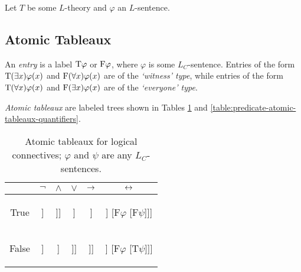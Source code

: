 Let $T$ be some $L$-theory and $\varphi$ an $L$-sentence.

\subsection{Atomic Tableaux}

An \emph{entry} is a label $\mathrm{T}\varphi$ or $\mathrm{F}\varphi$, where $\varphi$ is some $L_C$-sentence. Entries of the form $\mathrm{T}(\exists x)\varphi(x)$ and $\mathrm{F}(\forall x)\varphi(x)$ are of the \emph{`witness' type}, while entries of the form $\mathrm{T}(\forall x)\varphi(x)$ and $\mathrm{F}(\exists x)\varphi(x)$ are of the \emph{`everyone' type}.

\emph{Atomic tableaux} are labeled trees shown in Tables \ref{table:predicate-atomic-tableaux-logical} and \ref{table:predicate-atomic-tableaux-quantifiers}.

\begin{table}[htbp]
\centering
\begin{tabular}{@{}c||c|c|c|c|c@{}}
 & $\neg$ & $\land$ & $\lor$ & $\mathbin{\rightarrow}$ & $\mathbin{\leftrightarrow}$  \\ \midrule \midrule
True
&  
\begin{forest}
[$\mathrm{T}\neg\varphi$ [$\mathrm{F}\varphi$]]
\end{forest}
&  
\begin{forest}
[$\mathrm{T}\varphi\land\psi$ [$\mathrm{T}\varphi$ [$\mathrm{T}\psi$]]]
\end{forest}
& 
\begin{forest}
[$\mathrm{T}\varphi\lor\psi$ [$\mathrm{T}\varphi$] [$\mathrm{T}\psi$]]
\end{forest}
&
\begin{forest}
[$\mathrm{T}\varphi\limplies\psi$ [$\mathrm{F}\varphi$] [$\mathrm{T}\psi$]]
\end{forest}
&  
\begin{forest}
[$\mathrm{T}\varphi\liff\psi$ [$\mathrm{T}\varphi$ [$\mathrm{T}\psi$]] [$\mathrm{F}\varphi$ [$\mathrm{F}\psi$]]]
\end{forest}
\\ \midrule
False 
& 
\begin{forest}
[$\mathrm{F}\neg\varphi$ [$\mathrm{T}\varphi$]]
\end{forest}
&
\begin{forest}
[$\mathrm{F}\varphi\land\psi$ [$\mathrm{F}\varphi$] [$\mathrm{F}\psi$]]
\end{forest}
&
\begin{forest}
[$\mathrm{F}\varphi\lor\psi$ [$\mathrm{F}\varphi$ [$\mathrm{F}\psi$]]]
\end{forest}
&
\begin{forest}
[$\mathrm{F}\varphi\limplies\psi$ [$\mathrm{T}\varphi$ [$\mathrm{F}\psi$]]]
\end{forest}
&
\begin{forest}
[$\mathrm{F}\varphi\liff\psi$ [$\mathrm{T}\varphi$ [$\mathrm{F}\psi$]] [$\mathrm{F}\varphi$ [$\mathrm{T}\psi$]]]
\end{forest}
\end{tabular}
\caption{Atomic tableaux for logical connectives; $\varphi$ and $\psi$ are any $L_C$-sentences.}
\label{table:predicate-atomic-tableaux-logical}
\end{table}



